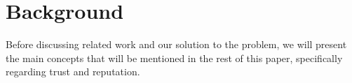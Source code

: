 
\section{Background}
\label{sec:Background}



Before discussing related work and our solution to the problem, we will present the main concepts that  will be mentioned in the rest of this paper, specifically regarding trust and reputation.

